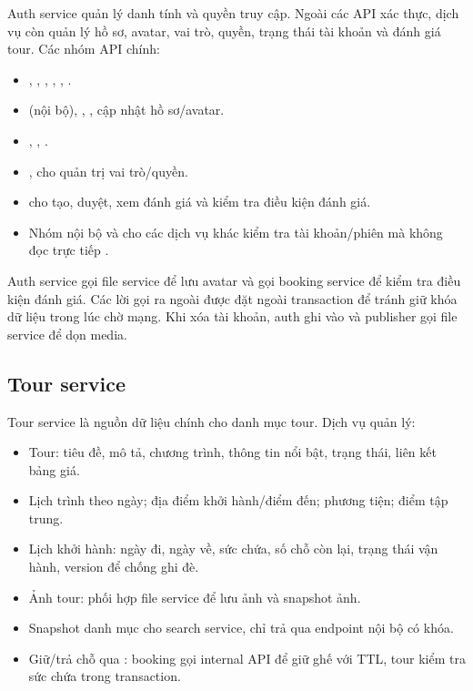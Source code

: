 Auth service quản lý danh tính và quyền truy cập. Ngoài các API xác thực, dịch vụ còn quản lý hồ sơ, avatar, vai trò, quyền, trạng thái tài khoản và đánh giá tour. Các nhóm API chính:

\begin{itemize}
  \item {}, , , , , .
  \item {} (nội bộ), , , cập nhật hồ sơ/avatar.
  \item {}, , .
  \item {},  cho quản trị vai trò/quyền.
  \item {} cho tạo, duyệt, xem đánh giá và kiểm tra điều kiện đánh giá.
  \item Nhóm nội bộ  và  cho các dịch vụ khác kiểm tra tài khoản/phiên mà không đọc trực tiếp .
\end{itemize}

Auth service gọi file service để lưu avatar và gọi booking service để kiểm tra điều kiện đánh giá. Các lời gọi ra ngoài được đặt ngoài transaction để tránh giữ khóa dữ liệu trong lúc chờ mạng. Khi xóa tài khoản, auth ghi  vào  và publisher gọi file service để dọn media.

\subsection{Tour service}
\label{subsec:tour-service}

Tour service là nguồn dữ liệu chính cho danh mục tour. Dịch vụ quản lý:

\begin{itemize}
  \item Tour: tiêu đề, mô tả, chương trình, thông tin nổi bật, trạng thái, liên kết bảng giá.
  \item Lịch trình theo ngày; địa điểm khởi hành/điểm đến; phương tiện; điểm tập trung.
  \item Lịch khởi hành: ngày đi, ngày về, sức chứa, số chỗ còn lại, trạng thái vận hành, version để chống ghi đè.
  \item Ảnh tour: phối hợp file service để lưu ảnh và snapshot ảnh.
  \item Snapshot danh mục cho search service, chỉ trả qua endpoint nội bộ có khóa.
  \item Giữ/trả chỗ qua : booking gọi internal API để giữ ghế với TTL, tour kiểm tra sức chứa trong transaction.
\end{itemize}


